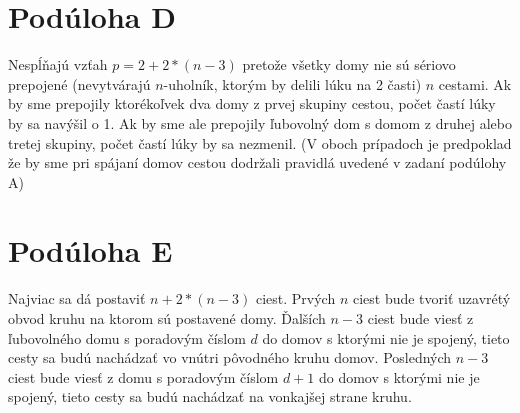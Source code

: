 \documentclass{article}
\begin{document}
\section{Podúloha D}

Nespĺňajú vzťah \(p = 2 + 2 * (n - 3)\) pretože všetky domy nie sú sériovo prepojené (nevytvárajú \(n\)-uholník, ktorým by delili lúku na 2 časti) \(n\) cestami. Ak by sme prepojily ktorékoľvek dva domy z prvej skupiny cestou, počet častí lúky by sa navýšil o 1. Ak by sme ale prepojily ľubovolný dom s domom z druhej alebo tretej skupiny, počet častí lúky by sa nezmenil. (V oboch prípadoch je predpoklad že by sme pri spájaní domov cestou dodržali pravidlá uvedené v zadaní podúlohy A)

\section{Podúloha E}

Najviac sa dá postaviť \(n + 2 * (n - 3)\) ciest. Prvých \(n\) ciest bude tvoriť uzavrétý obvod kruhu na ktorom sú postavené domy. Ďalších \(n - 3\) ciest bude viesť z ľubovolného domu s poradovým číslom \(d\) do domov s ktorými nie je spojený, tieto cesty sa budú nachádzať vo vnútri pôvodného kruhu domov. Posledných \(n - 3\) ciest bude viesť z domu s poradovým číslom \(d + 1\) do domov s ktorými nie je spojený, tieto cesty sa budú nachádzať na vonkajšej strane kruhu.
\end{document}

